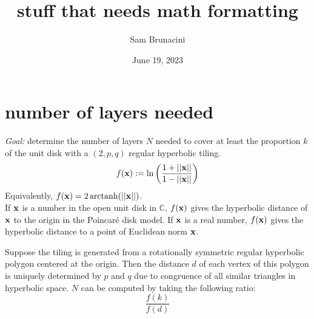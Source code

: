 \documentclass{article}
\title{stuff that needs math formatting}
\author{Sam Brunacini}
\date{June 19, 2023}
\DeclareMathOperator\arctanh{arctanh}
\begin{document}
\maketitle

\section{number of layers needed}
\textit{Goal:} determine the number of layers $N$ needed to cover at least the proportion $k$ of the unit disk with a $(2,p,q)$ regular hyperbolic tiling.\\

$$f(\bold{x}):=\ln\left(\frac{1+||\bold{x}||}{1-||\bold{x}||}\right)$$
Equivalently, $f(\bold{x})=2\arctanh(||\bold{x}||)$.\\
If $\bold{x}$ is a number in the open unit disk in $\mathbb{C}$, $f(\bold{x})$ gives the hyperbolic distance of $\bold{x}$ to the origin in the Poincaré disk model. If $\bold{x}$ is a real number, $f(\bold{x})$ gives the hyperbolic distance to a point of Euclidean norm $\bold{x}$.

Suppose the tiling is generated from a rotationally symmetric regular hyperbolic polygon centered at the origin. Then the distance $d$ of each vertex of this polygon is uniquely determined by $p$ and $q$ due to congruence of all similar triangles in hyperbolic space. $N$ can be computed by taking the following ratio:
$$ \frac{f(k)}{f(d)} $$
\end{document}
